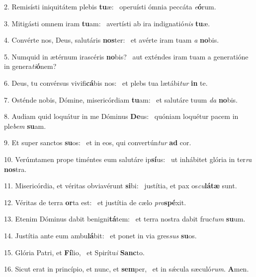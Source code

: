 2. Remisísti iniquitátem plebis \textbf{tu}æ: \ast\  operuísti ómnia peccáta \textit{e}\textbf{ó}rum.\

3. Mitigásti omnem iram \textbf{tu}am: \ast\  avertísti ab ira indignatió\textit{nis} \textbf{tu}æ.\

4. Convérte nos, Deus, salutáris \textbf{nos}ter: \ast\  et avérte iram tuam \textit{a} \textbf{no}bis.\

5. Numquid in ætérnum irascéris \textbf{no}bis? \ast\  aut exténdes iram tuam a generatióne in genera\textit{ti}\textbf{ó}nem?\

6. Deus, tu convérsus vivifi\textbf{cá}bis nos: \ast\  et plebs tua lætábi\textit{tur} \textbf{in} te.\

7. Osténde nobis, Dómine, misericórdiam \textbf{tu}am: \ast\  et salutáre tuum \textit{da} \textbf{no}bis.\

8. Audiam quid loquátur in me Dóminus \textbf{De}us: \ast\  quóniam loquétur pacem in ple\textit{bem} \textbf{su}am.\

9. Et super sanctos \textbf{su}os: \ast\  et in eos, qui convertún\textit{tur} \textbf{ad} cor.\

10. Verúmtamen prope timéntes eum salutáre ip\textbf{sí}us: \ast\  ut inhábitet glória in ter\textit{ra} \textbf{nos}tra.\

11. Misericórdia, et véritas obviavérunt \textbf{si}bi: \ast\  justítia, et pax os\textit{cu}\textbf{lá}\textbf{tæ} sunt.\

12. Véritas de terra \textbf{or}ta est: \ast\  et justítia de cælo \textit{pro}\textbf{spé}xit.\

13. Etenim Dóminus dabit benigni\textbf{tá}tem: \ast\  et terra nostra dabit fruc\textit{tum} \textbf{su}um.\

14. Justítia ante eum ambu\textbf{lá}bit: \ast\  et ponet in via gres\textit{sus} \textbf{su}os.\

15. Glória Patri, et \textbf{Fí}lio, \ast\  et Spirítu\textit{i} \textbf{Sanc}to.\

16. Sicut erat in princípio, et nunc, et \textbf{sem}per, \ast\  et in sǽcula sæculó\textit{rum}. \textbf{A}men.\

